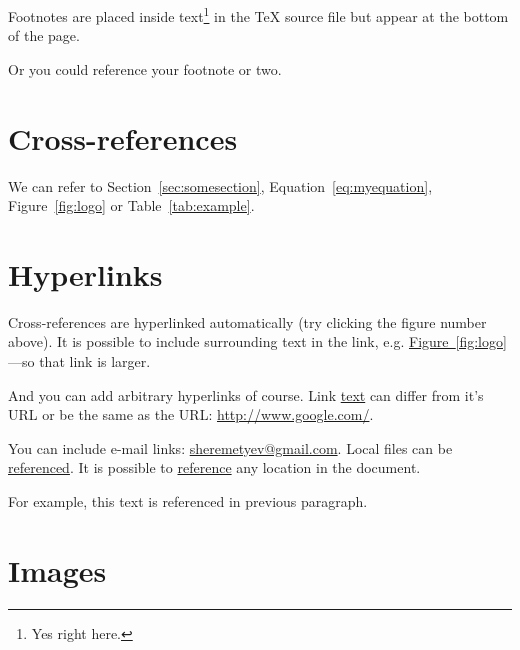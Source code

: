 \documentclass[10pt]{article}
\begin{document}
Footnotes are placed inside text\footnote{Yes right here.} in the \TeX{} source
file but appear at the bottom of the page.

Or you could reference\footnotemark{} your footnote or two\footnotemark{}.



\section{Cross-references}

We can refer to Section~\ref{sec:somesection},
Equation~\eqref{eq:myequation}, Figure~\ref{fig:logo} or
Table~\ref{tab:example}.

\section{Hyperlinks}

Cross-references are hyperlinked automatically (try clicking the figure number
above). It is possible to include surrounding text in the link, e.g.
\hyperref[fig:logo]{Figure~\ref*{fig:logo}}—so that
link is larger.

And you can add arbitrary hyperlinks of course.
Link \href{http://www.texts.io/}{text} can differ from it's URL or be the same
as the URL: \url{http://www.google.com/}.

You can include e-mail links:
\href{mailto:sheremetyev@gmail.com}{sheremetyev@gmail.com}. Local files can be
\href{run:basic.pdf}{referenced}. It is possible to
\hyperlink{mylabel}{reference} any location in the document.

\hypertarget{mylabel}{}
For example, this text is referenced in previous paragraph.

\section{Images}
\end{document}
